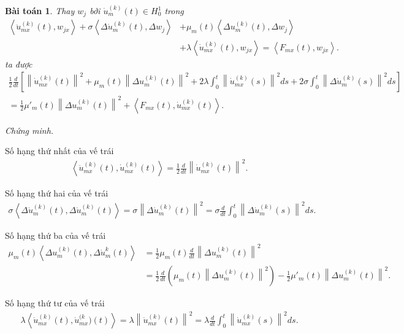 \documentclass[12pt,a4paper]{article}
\newtheorem{theorem}{Bài toán}[section]
\theoremstyle{definition}
\begin{document}
\begin{theorem}
Thay $w_j$ bởi $\dot{u}_m^{(k)}(t) \in H^1_0$ trong
\begin{align*}
    \left<\ddot{u}_{mx}^{(k)}(t), w_{jx}\right>
    + \sigma \left< \Delta \dot{u}_m^{(k)}(t), \Delta w_j\right>
    &+ \mu_m(t) \left<\Delta u_m^{(k)}(t), \Delta w_j\right> \\
    &+ \lambda \left<\dot{u}_{mx}^{(k)}(t), w_{jx}\right>
    = \left<F_{mx}(t), w_{jx}\right>.
\end{align*}
ta được
\begin{align*}
    \frac{1}{2} \frac{d}{dt} \left[ \left\|\dot{u}_{mx}^{(k)}(t)\right\|^2 + \mu_m(t) \left\|\Delta u_{m}^{(k)}(t)\right\|^2 + 2\lambda \int_0^t \left\|\dot{u}_{mx}^{(k)}(s)\right\|^2 ds + 2\sigma \int_0^t \left\|\Delta \dot{u}_{m}^{(k)}(s)\right\|^2 ds \right] \\
    = \frac{1}{2} \mu'_m(t) \left\|\Delta u_{m}^{(k)}(t)\right\|^2 + \left<F_{mx}(t), \dot{u}_{mx}^{(k)}(t)\right>.
\end{align*}
\end{theorem}

\textit{Chứng minh.}

Số hạng thứ nhất của vế trái
\begin{align*}
    \left<\ddot{u}_{mx}^{(k)}(t), \dot{u}_{mx}^{(k)}(t)\right>
    = \frac{1}{2} \frac{d}{dt} \left\|\dot{u}_{mx}^{(k)}(t)\right\|^2.
\end{align*}

Số hạng thứ hai của vế trái
\begin{align*}
    \sigma \left<\Delta \dot{u}_m^{(k)}(t), \Delta \dot{u}_m^{(k)}(t)\right>
    = \sigma \left\|\Delta \dot{u}_m^{(k)}(t)\right\|^2
    = \sigma \frac{d}{dt} \int_0^t \left\|\Delta \dot{u}_m^{(k)}(s)\right\|^2 ds.
\end{align*}

Số hạng thứ ba của vế trái
\begin{align*}
    \mu_m(t) \left<\Delta u_m^{(k)}(t), \Delta \dot{u}_m^{k}(t)\right>
    &= \frac{1}{2} \mu_m(t) \frac{d}{dt} \left\|\Delta u_m^{(k)}(t)\right\|^2 \\
    &= \frac{1}{2} \frac{d}{dt} \left(\mu_m(t) \left\|\Delta u_m^{(k)}(t)\right\|^2\right) - \frac{1}{2} \mu'_m(t) \left\|\Delta u_m^{(k)}(t)\right\|^2.
\end{align*}

Số hạng thứ tư của vế trái
\begin{align*}
    \lambda \left<\dot{u}_{mx}^{(k)}(t), \dot{u}_{mx}^{(k})(t)\right>
    = \lambda \left\|\dot{u}_{mx}^{(k)}(t)\right\|^2
    = \lambda \frac{d}{dt} \int_0^t \left\|\dot{u}_{mx}^{(k)}(s)\right\|^2 ds.
\end{align*}
\end{document}
